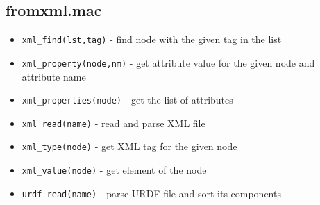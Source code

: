 \documentclass{article}
\begin{document}
\subsection{fromxml.mac} 

\begin{itemize}
    \item \texttt{xml\_find(lst,tag)} - find node with the given tag in the list
    \item \texttt{xml\_property(node,nm)} - get attribute value for the given node and attribute name
    \item \texttt{xml\_properties(node)} - get the list of attributes
    \item \texttt{xml\_read(name)} - read and parse XML file
    \item \texttt{xml\_type(node)} - get XML tag for the given node 
    \item \texttt{xml\_value(node)} - get element of the node
    \item \texttt{urdf\_read(name)} - parse URDF file and sort its components
\end{itemize}
\end{document}
